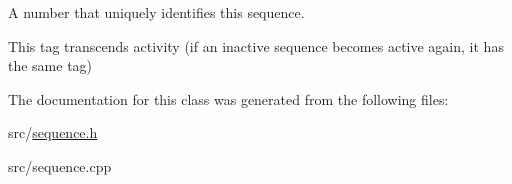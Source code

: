 A number that uniquely identifies this sequence. 

This tag transcends activity (if an inactive sequence becomes active again, it has the same tag) 

The documentation for this class was generated from the following files\+:\begin{DoxyCompactItemize}
\item 
src/\mbox{\hyperlink{sequence_8h}{sequence.\+h}}\item 
src/sequence.\+cpp\end{DoxyCompactItemize}

